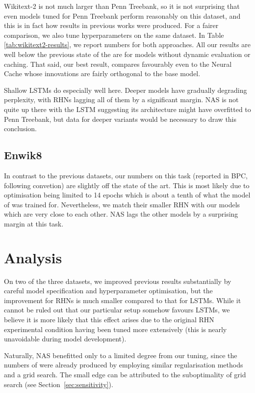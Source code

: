 \documentclass[letter]{article} \usepackage{iclr2018_conference,times}
\newcommand{\ptb}{Penn Treebank\xspace}
\newcommand{\wikitexttwo}{Wikitext-2\xspace}
\newcommand{\nlltoppl}[1]{\pgfmathparse{exp(#1)}\pgfmathprintnumber[fixed,zerofill,precision=1]{\pgfmathresult}}
\begin{document}
\wikitexttwo is not much larger than \ptb, so it is not surprising
that even models tuned for \ptb perform reasonably on this dataset,
and this is in fact how results in previous works were produced. For a
fairer comparison, we also tune hyperparameters on the same dataset.
In Table \ref{tab:wikitext2-results}, we report numbers for both
approaches. All our results are well below the previous state of the
are for models without dynamic evaluation or caching. That said, our
best result, \nlltoppl{4.188} compares favourably even to the Neural
Cache \citep{DBLP:journals/corr/GraveJU16} whose innovations are
fairly orthogonal to the base model.

Shallow LSTMs do especially well here. Deeper models have gradually
degrading perplexity, with RHNs lagging all of them by a significant
margin. NAS is not quite up there with the LSTM suggesting its
architecture might have overfitted to \ptb, but data for deeper
variants would be necessary to draw this conclusion.

\subsection{Enwik8}

In contrast to the previous datasets, our numbers on this task
(reported in BPC, following convetion) are slightly off the state of
the art. This is most likely due to optimisation being limited to 14
epochs which is about a tenth of what the model of
\citet{DBLP:journals/corr/ZillySKS16} was trained for. Nevertheless,
we match their smaller RHN with our models which are very close to
each other. NAS lags the other models by a surprising margin at this
task.

\section{Analysis}

On two of the three datasets, we improved previous results
substantially by careful model specification and hyperparameter
optimisation, but the improvement for RHNs is much smaller compared to
that for LSTMs. While it cannot be ruled out that our particular setup
somehow favours LSTMs, we believe it is more likely that this effect
arises due to the original RHN experimental condition having been
tuned more extensively (this is nearly unavoidable during model
development).

Naturally, NAS benefitted only to a limited degree from our tuning,
since the numbers of \citet{zoph2016neural} were already produced by
employing similar regularisation methods and a grid search. The small
edge can be attributed to the suboptimality of grid search (see
Section~\ref{sec:sensitivity}).
\end{document}

